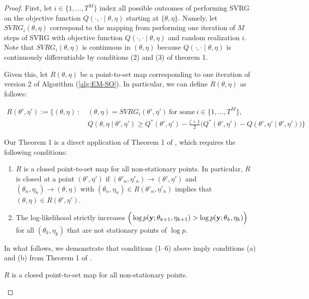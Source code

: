 %
\begin{proof}

First, let $i \in \{1,\ldots,T^M\}$ index all possible outcomes of performing SVRG on the objective function $Q(\cdot, \cdot \mid \theta, \eta)$ starting at $\{\theta,\eta\}$. Namely, let $SVRG_i(\theta,\eta)$ correspond to the mapping from performing one iteration of $M$ steps of SVRG with objective function $Q(\cdot, \cdot \mid \theta, \eta)$ and random realization $i$. Note that $SVRG_i(\theta,\eta)$ is continuous in $(\theta,\eta)$ because $Q(\cdot, \cdot \mid \theta, \eta)$ is continuously differentiable by conditions (2) and (3) of theorem 1.

Given this, let $R(\theta,\eta)$ be a point-to-set map corresponding to one iteration of version 2 of Algorithm (\ref{alg:EM-SO}). In particular, we can define $R(\theta,\eta)$ as follows:

\begin{align}
    R(\theta',\eta') := \Bigg\{(\theta,\eta) ~ : ~ & (\theta,\eta) = SVRG_i(\theta',\eta') ~ \text{for some} ~ i \in \{1,\ldots,T^M\}, \nonumber \\
    & Q(\theta, \eta \mid \theta', \eta') \geq Q^*(\theta', \eta') - \frac{\zeta + 1}{2} \Big( Q^*(\theta', \eta') - Q(\theta', \eta' \mid \theta', \eta') \Big)\Bigg\}
\end{align}

Our Theorem 1 is a direct application of Theorem 1 of \citet{Wu:1983}, which requires the following conditions:

\begin{enumerate}[label=(\alph*)]
    \item $R$ is a closed point-to-set map for all non-stationary points. In particular, $R$ is closed at a point $(\theta',\eta')$ if $(\theta'_{n},\eta'_{n}) \to (\theta',\eta')$ and $(\theta_{n},\eta_{n}) \to (\theta,\eta)$ with $(\theta_{n},\eta_{n}) \in R(\theta'_{n},\eta'_{n})$ implies that $(\theta,\eta) \in R(\theta',\eta')$. 
    \item The log-likelihood strictly increases $\Big(\log p(\mathbf{y};\theta_{k+1},\eta_{k+1}) > \log p(\mathbf{y};\theta_k,\eta_k)\Big)$ for all $(\theta_k,\eta_k)$ that are not stationary points of $\log p$.
\end{enumerate}

In what follows, we demonstrate that conditions (1--6) above imply conditions (a) and (b) from Theorem 1 of \citet{Wu:1983}.

\begin{lemma}
    $R$ is a closed point-to-set map for all non-stationary points.
\end{lemma}


\end{proof}
